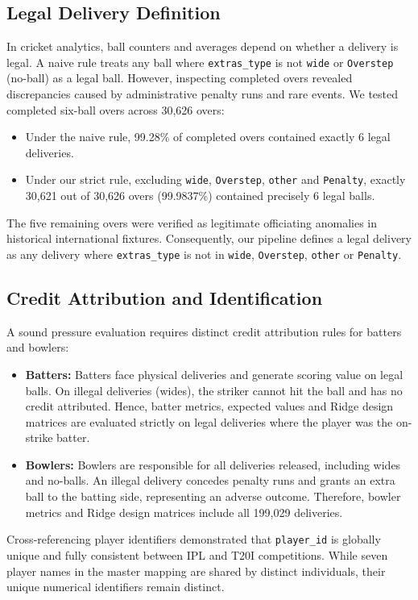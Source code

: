 \documentclass[11pt,a4paper]{article}
\begin{document}
\subsection{Legal Delivery Definition}
In cricket analytics, ball counters and averages depend on whether a delivery is legal. A naive rule treats any ball where \texttt{extras\_type} is not \texttt{wide} or \texttt{Overstep} (no-ball) as a legal ball. However, inspecting completed overs revealed discrepancies caused by administrative penalty runs and rare events. We tested completed six-ball overs across 30,626 overs:
\begin{itemize}
    \item Under the naive rule, 99.28\% of completed overs contained exactly 6 legal deliveries.
    \item Under our strict rule, excluding \texttt{wide}, \texttt{Overstep}, \texttt{other} and \texttt{Penalty}, exactly 30,621 out of 30,626 overs (99.9837\%) contained precisely 6 legal balls.
\end{itemize}
The five remaining overs were verified as legitimate officiating anomalies in historical international fixtures. Consequently, our pipeline defines a legal delivery as any delivery where \texttt{extras\_type} is not in \texttt{wide}, \texttt{Overstep}, \texttt{other} or \texttt{Penalty}.

\subsection{Credit Attribution and Identification}
A sound pressure evaluation requires distinct credit attribution rules for batters and bowlers:
\begin{itemize}
    \item \textbf{Batters:} Batters face physical deliveries and generate scoring value on legal balls. On illegal deliveries (wides), the striker cannot hit the ball and has no credit attributed. Hence, batter metrics, expected values and Ridge design matrices are evaluated strictly on legal deliveries where the player was the on-strike batter.
    \item \textbf{Bowlers:} Bowlers are responsible for all deliveries released, including wides and no-balls. An illegal delivery concedes penalty runs and grants an extra ball to the batting side, representing an adverse outcome. Therefore, bowler metrics and Ridge design matrices include all 199,029 deliveries.
\end{itemize}
Cross-referencing player identifiers demonstrated that \texttt{player\_id} is globally unique and fully consistent between IPL and T20I competitions. While seven player names in the master mapping are shared by distinct individuals, their unique numerical identifiers remain distinct.
\end{document}
